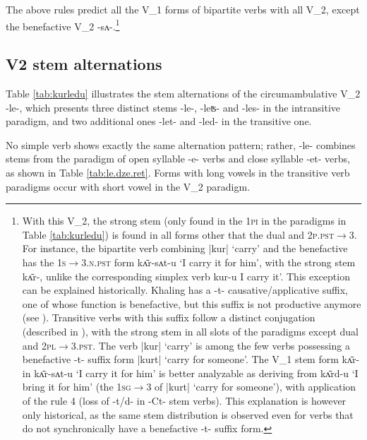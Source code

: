\documentclass[oneside,a4paper,11pt]{article}
\newcommand{\ipa}[1]{{\phon#1}}
\newcommand{\dhatu}[2]{|\ipa{#1}| `#2'}
\begin{document}
The above rules predict all the V_1 forms of bipartite verbs with all V_2, except the benefactive V_2 \ipa{-sʌ-}.\footnote{With this V_2, the strong stem (only found in the \textsc{1pi} in the paradigms in Table \ref{tab:kurledu}) is found in all forms other that the dual and \textsc{2p.pst$\rightarrow$3}. For instance, the bipartite verb combining \dhatu{kur}{carry} and the benefactive has the \textsc{1s$\rightarrow$3.n.pst} form \ipa{kʌ̄r-sʌt-u} `I carry it for him', with the strong stem \ipa{kʌ̄r-}, unlike the corresponding simplex verb  \ipa{kur-u}  I carry it'. This exception can be explained historically. Khaling has a \ipa{-t-} causative/applicative suffix, one of whose function is benefactive, but this suffix is not productive anymore (see \citealt{jacques15derivational.khaling}). Transitive verbs with this suffix follow a distinct conjugation (described in \citealt[1119-1122]{jacques12khaling}), with the strong stem  in all slots of the paradigms except dual and \textsc{2pl$\rightarrow$3.pst}. The verb \dhatu{kur}{carry} is among the few verbs possessing a benefactive \ipa{-t-} suffix form \dhatu{kurt}{carry for someone}. The V_1 stem form \ipa{kʌ̄r-} in \ipa{kʌ̄r-sʌt-u} `I carry it for him' is better analyzable as deriving from \ipa{kʌ̄rd-u} `I bring it for him' (the \textsc{1sg$\rightarrow$3} of \dhatu{kurt}{carry for someone}), with application of the rule 4 (loss of \ipa{-t/d-} in \ipa{-Ct-} stem verbs). This explanation is however only historical, as the same stem distribution is observed even for verbs that do not synchronically have a benefactive \ipa{-t-} suffix form.}

\subsection{V2 stem alternations}
Table \ref{tab:kurledu} illustrates the stem alternations of the circumambulative V_2 \ipa{-le-}, which presents three distinct stems \ipa{-le-}, \ipa{-leʦ-} and \ipa{-les-} in the intransitive paradigm, and two additional ones \ipa{-let-} and \ipa{-led-} in the transitive one.

No simple verb shows exactly the same alternation pattern; rather,  \ipa{-le-} combines stems from the paradigm of open syllable \ipa{-e-} verbs and close syllable \ipa{-et-} verbs, as shown in Table \ref{tab:le.dze.ret}. Forms with long vowels in the transitive verb paradigms occur with short vowel in the V_2 paradigm.
\end{document}
